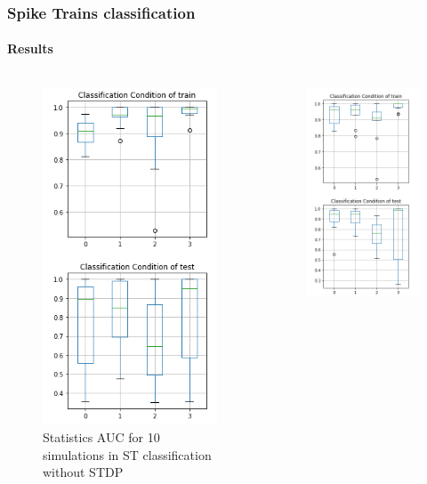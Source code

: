 \documentclass[10pt,aspectratio=43,mathserif, notes]{beamer}
\begin{document}
		\begin{frame}
		  \frametitle{\textbf{Spike Trains classification}}
		  \framesubtitle{Results}
            \begin{columns}
            \begin{column}{0.5\textwidth}
            \begin{figure}[h]
            \centering
            \includegraphics[width=0.5\linewidth]{image/ST_without_stdp_party.png}
            \caption{Statistics AUC for 10 simulations in ST classification without STDP}
            \label{ST_Task}
            \end{figure}
            \end{column}
            \begin{column}{0.5\textwidth}
            \begin{figure}[h]
            \centering
            \includegraphics[width=0.5\linewidth]{image/ST_with_stdp_party.png}

\end{figure}
\end{column}
\end{columns}
\end{frame}
\end{document}
